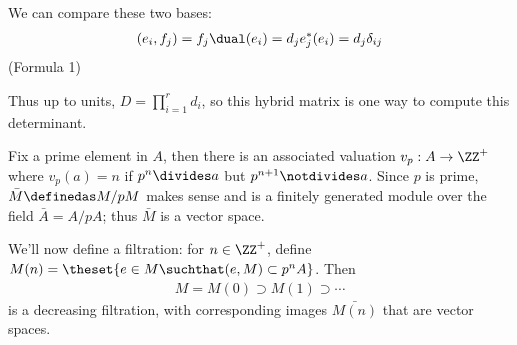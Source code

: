 We can compare these two bases:
\begin{align*}
(e_i, f_j) = f_j\dual(e_i) = d_j e_j^* (e_i) = d_j \delta_{ij}
\end{align*} (Formula 1)

Thus up to units, \(D = \prod_{i=1}^r d_i\), so this hybrid matrix is
one way to compute this determinant.

Fix a prime element in \(A\), then there is an associated valuation
\(v_p: A \to \ZZ^+\) where \(v_p(a) = n\) if \(p^n \divides a\) but
\(p^{n+1}\notdivides a\). Since \(p\) is prime,
\(\bar M \definedas M/pM\) makes sense and is a finitely generated
module over the field \(\bar A = A/pA\); thus \(\bar M\) is a vector
space.

We'll now define a filtration: for \(n\in \ZZ^+\), define
\(M(n) = \theset{e\in M\suchthat (e, M) \subset p^n A}\). Then
\begin{align*}
M = M(0) \supset M(1) \supset \cdots
\end{align*} is a decreasing filtration, with corresponding images
\(\bar{M(n)}\) that are vector spaces.

